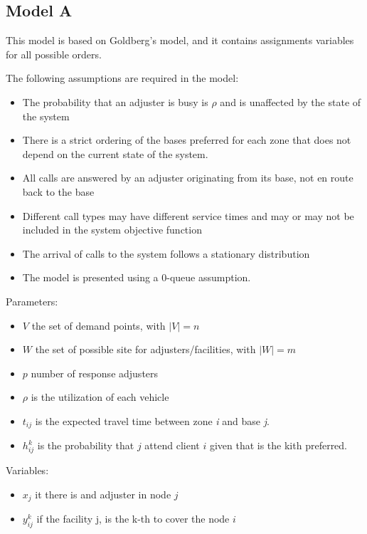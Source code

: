 
\subsection{Model A}

\begin{frame}
  This model is based on Goldberg's model, and it contains assignments
  variables for all possible orders.

  The following assumptions are required in the model:
  \begin{itemize}
  \item The probability that an adjuster is busy is $\rho$
    and is unaffected by the state of the system
  \item There is a strict ordering of the bases preferred for each zone
    that does not depend on the current state of the system. 
  \item All calls are answered by an adjuster originating from its base,
    not en route back to the base
  \item Different call types may have different service times
    and may or may not be included in the system objective function
  \item The arrival of calls to the system follows a stationary distribution
  \item The model is presented using a 0-queue assumption.
  \end{itemize}
  
\end{frame}


\begin{frame}
  Parameters:
  \begin{itemize}
  \item $V$ the set of demand points, with $|V| = n$
  \item $W$ the set of possible site for adjusters/facilities, with $|W| = m$
  \item $p$ number of response adjusters
  \item $\rho$ is the utilization of each vehicle
  \item $t_{ij}$ is the expected travel time between zone \textit{i} and base \textit{j}.
  \item $h_{ij}^{k}$ is the probability that $j$ attend client $i$ given that
    is the kith preferred.
  \end{itemize}
  
  Variables:
  \begin{itemize}
  \item $x_j$ it there is and adjuster in node $j$
  \item $y_{ij}^k$ if the facility j, is the k-th to cover the node $i$
  \end{itemize}
\end{frame}

